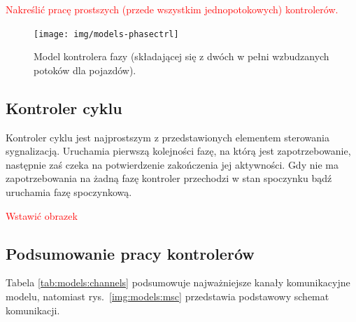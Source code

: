 \documentclass{pracamgr}
\newcommand{\imgr}[1]{rys.~\ref{#1}}
\newcommand{\todo}[1]{\textcolor{red}{#1}}
\theoremstyle{plain}
\begin{document}
\todo{Nakreślić pracę prostszych (przede wszystkim jednopotokowych) kontrolerów.}

\begin{figure}
  \centering
  \texttt{[image: img/models-phasectrl]}
  \caption{Model kontrolera fazy (składającej się z dwóch w pełni wzbudzanych potoków dla pojazdów).}
  \label{img:phase-ctrl}
\end{figure}

\subsection{Kontroler cyklu}
Kontroler cyklu jest najprostszym z przedstawionych elementem
sterowania sygnalizacją. Uruchamia pierwszą kolejności fazę,
na którą jest zapotrzebowanie, następnie zaś czeka na potwierdzenie
zakończenia jej aktywności. Gdy nie ma zapotrzebowania na żadną fazę
kontroler przechodzi w stan spoczynku bądź uruchamia fazę spoczynkową.

\todo{Wstawić obrazek}

\subsection{Podsumowanie pracy kontrolerów}

Tabela \ref{tab:models:channels} podsumowuje najważniejsze kanały
komunikacyjne modelu, natomiast \imgr{img:models:msc} przedstawia
podstawowy schemat komunikacji.
\end{document}
